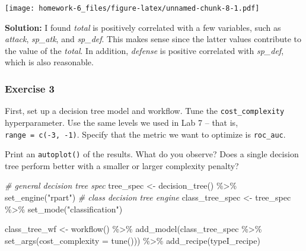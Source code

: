 \documentclass[
]{article}
\newenvironment{Shaded}{\begin{snugshade}}{\end{snugshade}}
\newcommand{\AttributeTok}[1]{\textcolor[rgb]{0.77,0.63,0.00}{#1}}
\newcommand{\CommentTok}[1]{\textcolor[rgb]{0.56,0.35,0.01}{\textit{#1}}}
\newcommand{\FunctionTok}[1]{\textcolor[rgb]{0.00,0.00,0.00}{#1}}
\newcommand{\NormalTok}[1]{#1}
\newcommand{\OtherTok}[1]{\textcolor[rgb]{0.56,0.35,0.01}{#1}}
\newcommand{\SpecialCharTok}[1]{\textcolor[rgb]{0.00,0.00,0.00}{#1}}
\newcommand{\StringTok}[1]{\textcolor[rgb]{0.31,0.60,0.02}{#1}}
\begin{document}
\texttt{[image: homework-6\_files/figure-latex/unnamed-chunk-8-1.pdf]}

\textbf{Solution: } I found \emph{total} is positively correlated with a
few variables, such as \emph{attack}, \emph{sp\_atk}, and
\emph{sp\_def}. This makes sense since the latter values contribute to
the value of the \emph{total}. In addition, \emph{defense} is positive
correlated with \emph{sp\_def}, which is also reasonable.

\hypertarget{exercise-3}{%
\subsubsection{Exercise 3}\label{exercise-3}}

First, set up a decision tree model and workflow. Tune the
\texttt{cost\_complexity} hyperparameter. Use the same levels we used in
Lab 7 -- that is, \texttt{range\ =\ c(-3,\ -1)}. Specify that the metric
we want to optimize is \texttt{roc\_auc}.

Print an \texttt{autoplot()} of the results. What do you observe? Does a
single decision tree perform better with a smaller or larger complexity
penalty?

\begin{Shaded}
\begin{Highlighting}[]
\CommentTok{\# general decision tree spec}
\NormalTok{tree\_spec }\OtherTok{\textless{}{-}} \FunctionTok{decision\_tree}\NormalTok{() }\SpecialCharTok{\%\textgreater{}\%}
  \FunctionTok{set\_engine}\NormalTok{(}\StringTok{"rpart"}\NormalTok{)}
\CommentTok{\# class decision tree engine }
\NormalTok{class\_tree\_spec }\OtherTok{\textless{}{-}}\NormalTok{ tree\_spec }\SpecialCharTok{\%\textgreater{}\%}
  \FunctionTok{set\_mode}\NormalTok{(}\StringTok{"classification"}\NormalTok{)}

\NormalTok{class\_tree\_wf }\OtherTok{\textless{}{-}} \FunctionTok{workflow}\NormalTok{() }\SpecialCharTok{\%\textgreater{}\%}
  \FunctionTok{add\_model}\NormalTok{(class\_tree\_spec }\SpecialCharTok{\%\textgreater{}\%} \FunctionTok{set\_args}\NormalTok{(}\AttributeTok{cost\_complexity =} \FunctionTok{tune}\NormalTok{())) }\SpecialCharTok{\%\textgreater{}\%}
  \FunctionTok{add\_recipe}\NormalTok{(typeI\_recipe)}
\end{Highlighting}
\end{Shaded}
\end{document}
